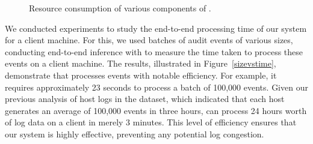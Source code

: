  \begin{figure}[!t]
  \centering
  \hfill
  \hfill
  \hfill
  \hfill
  \hfill
  \caption{Resource consumption of various components of \Sys.}
  \label{fig:resource}
  \vspace{-2ex}
\end{figure}

We conducted experiments to study the end-to-end processing time of our system for a client machine. For this, we used batches of audit events of various sizes, conducting end-to-end inference with \Sys to measure the time taken to process these events on a client machine. The results, illustrated in Figure~\ref{sizevstime}, demonstrate that \Sys processes events with notable efficiency. For example, it requires approximately 23 seconds to process a batch of 100,000 events. Given our previous analysis of host logs in the \optc dataset, which indicated that each host generates an average of 100,000 events in three hours, \Sys can process 24 hours worth of log data on a client in merely 3 minutes. This level of efficiency ensures that our system is highly effective, preventing any potential log congestion.

